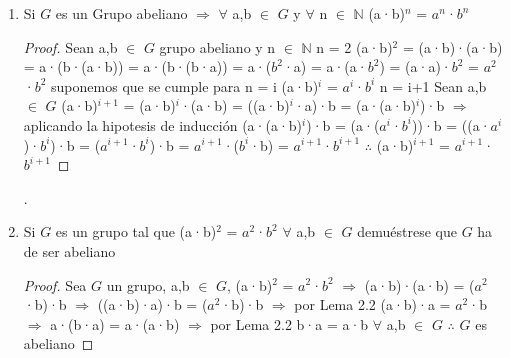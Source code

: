 \documentclass[10pt,a4paper,oneside]{article}
\begin{document}
\begin{enumerate}[1.]
\begin{enumerate}[a)]
\begin{proof}
								\end{proof}
						\end{enumerate}
					\item Si $G$ es un Grupo abeliano $\Rightarrow$ $\forall$ a,b $\in$ $G$ y $\forall$ n $\in$ $\mathbb{N}$ (a·b)$^n$ = $a^n$·$b^n$
					\begin{proof}
						Sean a,b $\in$ $G$ grupo abeliano y n $\in$ $\mathbb{N}$
						\newline
						n = 2
						\newline
						(a·b)$^2$ = (a·b)·(a·b) = a·(b·(a·b)) = a·(b·(b·a)) = a·($b^2$·a) = a·(a·$b^2$) = (a·a)·$b^2$ = $a^2$·$b^2$
						\newline
						\newline
						suponemos que se cumple para n = i
						\newline
						(a·b)$^i$ = $a^i$·$b^i$
						\newline
						\newline
						n = i+1
						\newline
						Sean a,b $\in$ $G$ (a·b)$^{i+1}$ = (a·b)$^{i}$·(a·b) = ((a·b)$^{i}$·a)·b = (a·(a·b)$^{i}$)·b $\Rightarrow$ aplicando la hipotesis de inducción (a·(a·b)$^{i}$)·b = (a·($a^i$·$b^i$))·b = ((a·$a^i$)·$b^i$)·b = ($a^{i+1}$·$b^i$)·b = $a^{i+1}$·($b^i$·b) = $a^{i+1}$·$b^{i+1}$ $\therefore$ (a·b)$^{i+1}$ = $a^{i+1}$·$b^{i+1}$
					\end{proof}.
					\item Si $G$ es un grupo tal que (a·b)$^2$ = $a^2$·$b^2$ $\forall$ a,b $\in$ $G$ demuéstrese que $G$ ha de ser abeliano
					\begin{proof}
						Sea $G$ un grupo, a,b $\in$ $G$, (a·b)$^2$ = $a^2$·$b^2$ $\Rightarrow$ (a·b)·(a·b) = ($a^2$·b)·b $\Rightarrow$ ((a·b)·a)·b = ($a^2$·b)·b $\Rightarrow$ por Lema 2.2 (a·b)·a = $a^2$·b $\Rightarrow$ a·(b·a) = a·(a·b) $\Rightarrow$ por Lema 2.2 b·a = a·b $\forall$ a,b $\in$ $G$ $\therefore$ $G$ es abeliano

\end{proof}
\end{enumerate}
\end{document}
